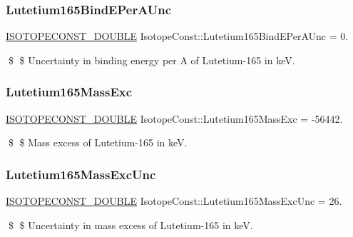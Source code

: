 \subsubsection{\texorpdfstring{Lutetium165\+Bind\+E\+Per\+A\+Unc}{Lutetium165BindEPerAUnc}}
{\footnotesize\ttfamily \mbox{\hyperlink{group___isotope_const-_macros_ga8f45a7272ce02c0b4c65c44636ed719a}{I\+S\+O\+T\+O\+P\+E\+C\+O\+N\+S\+T\+\_\+\+D\+O\+U\+B\+LE}} Isotope\+Const\+::\+Lutetium165\+Bind\+E\+Per\+A\+Unc = 0.}

\$ \$ Uncertainty in binding energy per A of Lutetium-\/165 in keV. \mbox{\label{group___isotope_const-_lutetium-_lu165_ga349d69010512be9166f72fa087483337}} 
\subsubsection{\texorpdfstring{Lutetium165\+Mass\+Exc}{Lutetium165MassExc}}
{\footnotesize\ttfamily \mbox{\hyperlink{group___isotope_const-_macros_ga8f45a7272ce02c0b4c65c44636ed719a}{I\+S\+O\+T\+O\+P\+E\+C\+O\+N\+S\+T\+\_\+\+D\+O\+U\+B\+LE}} Isotope\+Const\+::\+Lutetium165\+Mass\+Exc = -\/56442.}

\$ \$ Mass excess of Lutetium-\/165 in keV. \mbox{\label{group___isotope_const-_lutetium-_lu165_ga4729d14912ed6e419900e95893a93814}} 
\subsubsection{\texorpdfstring{Lutetium165\+Mass\+Exc\+Unc}{Lutetium165MassExcUnc}}
{\footnotesize\ttfamily \mbox{\hyperlink{group___isotope_const-_macros_ga8f45a7272ce02c0b4c65c44636ed719a}{I\+S\+O\+T\+O\+P\+E\+C\+O\+N\+S\+T\+\_\+\+D\+O\+U\+B\+LE}} Isotope\+Const\+::\+Lutetium165\+Mass\+Exc\+Unc = 26.}

\$ \$ Uncertainty in mass excess of Lutetium-\/165 in keV. \mbox{\label{group___isotope_const-_lutetium-_lu165_ga4929e2424469e4009cd857212b9e998f}} 
